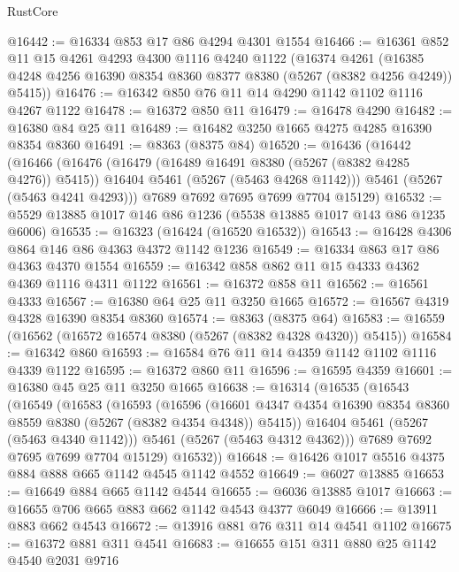 \begin{lexlean}{RustCore}
\begin{coremodule}
@16442 := @16334 @853 @17 @86 @4294 @4301 @1554
@16466 := @16361
    @852
    @11
    @15
    @4261
    @4293
    @4300
    @1116
    @4240
    @1122
    (@16374
      @4261
      (@16385 @4248 @4256 @16390 @8354 @8360 @8377 @8380 (@5267 (@8382 @4256 @4249)) @5415))
@16476 := @16342 @850 @76 @11 @14 @4290 @1142 @1102 @1116 @4267 @1122
@16478 := @16372 @850 @11
@16479 := @16478 @4290
@16482 := @16380 @84 @25 @11
@16489 := @16482 @3250 @1665 @4275 @4285 @16390 @8354 @8360
@16491 := @8363 (@8375 @84)
@16520 := @16436
    (@16442
      (@16466
        (@16476
          (@16479 (@16489 @16491 @8380 (@5267 (@8382 @4285 @4276)) @5415))
          @16404
          @5461
          (@5267 (@5463 @4268 @1142)))
        @5461
        (@5267 (@5463 @4241 @4293)))
      @7689
      @7692
      @7695
      @7699
      @7704
      @15129)
@16532 := @5529 @13885 @1017 @146 @86 @1236 (@5538 @13885 @1017 @143 @86 @1235 @6006)
@16535 := @16323 (@16424 (@16520 @16532))
@16543 := @16428 @4306 @864 @146 @86 @4363 @4372 @1142 @1236
@16549 := @16334 @863 @17 @86 @4363 @4370 @1554
@16559 := @16342 @858 @862 @11 @15 @4333 @4362 @4369 @1116 @4311 @1122
@16561 := @16372 @858 @11
@16562 := @16561 @4333
@16567 := @16380 @64 @25 @11 @3250 @1665
@16572 := @16567 @4319 @4328 @16390 @8354 @8360
@16574 := @8363 (@8375 @64)
@16583 := @16559 (@16562 (@16572 @16574 @8380 (@5267 (@8382 @4328 @4320)) @5415))
@16584 := @16342 @860
@16593 := @16584 @76 @11 @14 @4359 @1142 @1102 @1116 @4339 @1122
@16595 := @16372 @860 @11
@16596 := @16595 @4359
@16601 := @16380 @45 @25 @11 @3250 @1665
@16638 := @16314
    (@16535
      (@16543
        (@16549
          (@16583
            (@16593
              (@16596
                (@16601
                  @4347
                  @4354
                  @16390
                  @8354
                  @8360
                  @8559
                  @8380
                  (@5267 (@8382 @4354 @4348))
                  @5415))
              @16404
              @5461
              (@5267 (@5463 @4340 @1142)))
            @5461
            (@5267 (@5463 @4312 @4362)))
          @7689
          @7692
          @7695
          @7699
          @7704
          @15129)
        @16532))
@16648 := @16426 @1017 @5516 @4375 @884 @888 @665 @1142 @4545 @1142 @4552
@16649 := @6027 @13885
@16653 := @16649 @884 @665 @1142 @4544
@16655 := @6036 @13885 @1017
@16663 := @16655 @706 @665 @883 @662 @1142 @4543 @4377 @6049
@16666 := @13911 @883 @662 @4543
@16672 := @13916 @881 @76 @311 @14 @4541 @1102
@16675 := @16372 @881 @311 @4541
@16683 := @16655 @151 @311 @880 @25 @1142 @4540 @2031 @9716

\end{coremodule}
\end{lexlean}
